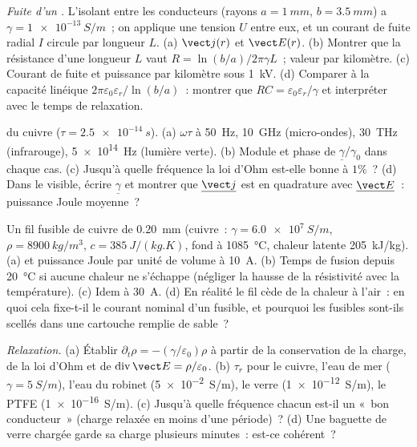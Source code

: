 \begin{exercise}[$\star\star$]\label{exo:b2:charges-currents-conduction:6}
\emph{Fuite d'un .} L'isolant entre les conducteurs
(rayons $a = \qty{1}{mm}$, $b = \qty{3.5}{mm}$) a $\gamma = \qty{1e-13}{S/m}$~; on applique une
tension $U$ entre eux, et un courant de fuite radial $I$ circule
par longueur $L$. (a) $\vect j(r)$ et $\vect E(r)$. (b) Montrer que la
résistance d'une longueur $L$ vaut $R = \ln(b/a)/2\pi\gamma L$~; valeur par
kilomètre. (c) Courant de fuite et puissance par kilomètre sous \qty{1}{kV}.
(d) Comparer à la capacité linéique $2\pi\varepsilon_0\varepsilon_r/\ln(b/a)$~:
montrer que $RC = \varepsilon_0\varepsilon_r/\gamma$ et interpréter avec le temps de relaxation.
\end{exercise}

\begin{exercise}[$\star\star$]\label{exo:b2:charges-currents-conduction:7}
 du cuivre ($\tau = \qty{2.5e-14}{s}$). (a) $\omega\tau$ à
\qty{50}{Hz}, \qty{10}{GHz} (micro-ondes), \qty{30}{THz} (infrarouge), \qty{5e14}{Hz}
(lumière verte). (b) Module et phase de $\underline\gamma/\gamma_0$ dans chaque cas.
(c) Jusqu'à quelle fréquence la loi d'Ohm est-elle bonne à $1\%$~? (d) Dans le visible,
écrire $\underline\gamma$ et montrer que $\underline{\vect j}$ est en quadrature avec
$\underline{\vect E}$~: puissance Joule moyenne~?
\end{exercise}

\begin{exercise}[$\star\star$]\label{exo:b2:charges-currents-conduction:8}
Un fil fusible de cuivre de \qty{0.20}{mm} (cuivre~: $\gamma = \qty{6.0e7}{S/m}$, $\rho =
\qty{8900}{kg/m^3}$, $c = \qty{385}{J/(kg.K)}$, fond à \qty{1085}{\degreeCelsius},
chaleur latente \qty{205}{kJ/kg}). (a)  et puissance Joule par
unité de volume à \qty{10}{A}. (b) Temps de fusion depuis \qty{20}{\degreeCelsius} si aucune
chaleur ne s'échappe (négliger la hausse de la résistivité avec la température). (c)
Idem à \qty{30}{A}. (d) En réalité le fil cède de la chaleur à l'air~: en quoi cela
fixe-t-il le courant nominal d'un fusible, et pourquoi les fusibles sont-ils scellés dans une
cartouche remplie de sable~?
\end{exercise}

\begin{exercise}[$\star\star$]\label{exo:b2:charges-currents-conduction:9}
\emph{Relaxation.} (a) Établir $\partial_t\rho = -(\gamma/\varepsilon_0)\rho$ à partir de la conservation
de la charge, de la loi d'Ohm et de $\operatorname{div}\vect E = \rho/\varepsilon_0$. (b)
$\tau_r$ pour le cuivre, l'eau de mer ($\gamma = \qty{5}{S/m}$), l'eau du robinet
(\qty{5e-2}{S/m}), le verre (\qty{1e-12}{S/m}), le PTFE (\qty{1e-16}{S/m}). (c)
Jusqu'à quelle fréquence chacun est-il un «~bon conducteur~» (charge relaxée en moins
d'une période)~? (d) Une baguette de verre chargée garde sa charge plusieurs minutes~: est-ce
cohérent~?
\end{exercise}

